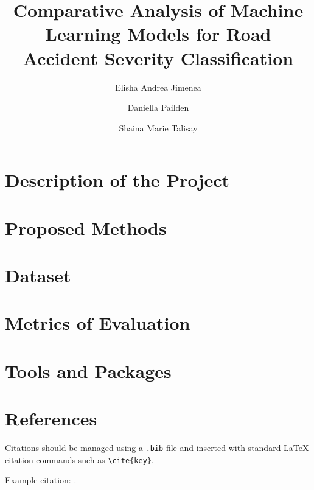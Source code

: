 \documentclass[runningheads]{llncs}
\begin{document}
\title{Comparative Analysis of Machine Learning Models for Road Accident Severity Classification}

\author{
Elisha Andrea Jimenea \and
Daniella Pailden \and
Shaina Marie Talisay
}



\maketitle



\section{Description of the Project}


\section{Proposed Methods}


\section{Dataset}


\section{Metrics of Evaluation}


\section{Tools and Packages}


\section{References}
Citations should be managed using a \texttt{.bib} file and inserted with standard LaTeX citation commands such as \texttt{\textbackslash cite\{key\}}.

Example citation: \cite{example2024study}.



\end{document}
